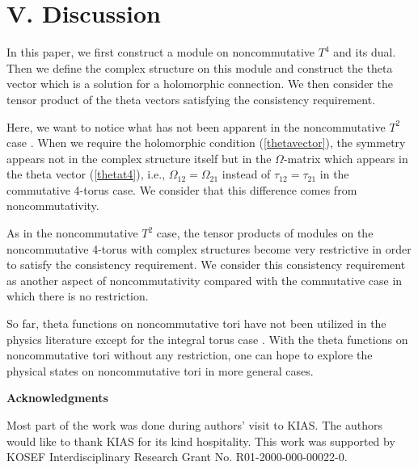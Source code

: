 \documentclass[12pt, a4paper]{article}
\begin{document}



\section*{V. Discussion}

In this paper, we first construct a module on noncommutative $T^4$
and its dual. Then we define the complex structure on this module
and construct the theta vector which is a solution for a
holomorphic connection. We then consider the tensor product of the
theta vectors satisfying the consistency requirement.

Here, we want to notice what has not been apparent in the
noncommutative $T^2$ case \cite{ds02}. When we require the
holomorphic condition (\ref{thetavector}), the symmetry appears
not in the complex structure itself but in the $\Omega$-matrix
which appears in the theta vector (\ref{thetat4}), i.e.,
$\Omega_{12}=\Omega_{21}$ instead of $\tau_{12} = \tau_{21} $ in
the commutative 4-torus case. We consider that this difference
comes from noncommutativity.

As in the noncommutative $T^2$ case, the tensor products of
modules on the noncommutative 4-torus with complex structures
become very restrictive in order to satisfy the consistency
requirement. We consider this consistency requirement as another
aspect of noncommutativity compared with the commutative case in
which there is no restriction.

So far, theta functions on noncommutative tori have not been
utilized in the physics literature except for the integral torus
case \cite{mm01,ghs01,hsy02}. With the theta functions on
noncommutative tori without any restriction, one can hope to
explore the physical states on noncommutative tori in more general
cases.
\\






\vspace{5mm}

\noindent
{\Large \bf Acknowledgments}

\vspace{5mm}
\noindent
Most part of the work was done during
authors' visit to KIAS. The authors would like to thank KIAS for
its kind hospitality. This work was supported by KOSEF
Interdisciplinary Research Grant No. R01-2000-000-00022-0.
\end{document}
